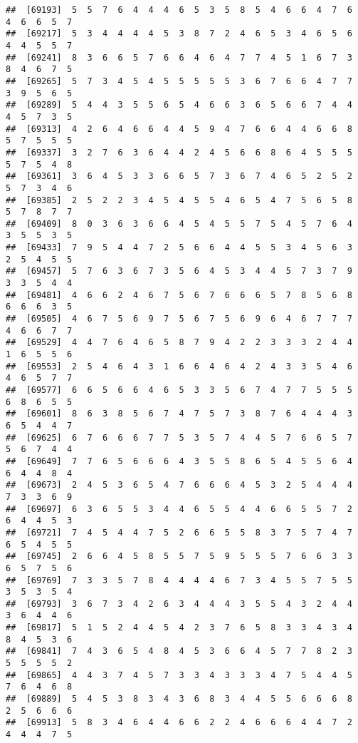 \documentclass[
]{book}
\begin{document}
\begin{verbatim}
##  [69193]  5  5  7  6  4  4  4  6  5  3  5  8  5  4  6  6  4  7  6  4  6  6  5  7
##  [69217]  5  3  4  4  4  4  5  3  8  7  2  4  6  5  3  4  6  5  6  4  4  5  5  7
##  [69241]  8  3  6  6  5  7  6  6  4  6  4  7  7  4  5  1  6  7  3  8  4  6  7  5
##  [69265]  5  7  3  4  5  4  5  5  5  5  5  3  6  7  6  6  4  7  7  3  9  5  6  5
##  [69289]  5  4  4  3  5  5  6  5  4  6  6  3  6  5  6  6  7  4  4  4  5  7  3  5
##  [69313]  4  2  6  4  6  6  4  4  5  9  4  7  6  6  4  4  6  6  8  5  7  5  5  5
##  [69337]  3  2  7  6  3  6  4  4  2  4  5  6  6  8  6  4  5  5  5  5  7  5  4  8
##  [69361]  3  6  4  5  3  3  6  6  5  7  3  6  7  4  6  5  2  5  2  5  7  3  4  6
##  [69385]  2  5  2  2  3  4  5  4  5  5  4  6  5  4  7  5  6  5  8  5  7  8  7  7
##  [69409]  8  0  3  6  3  6  6  4  5  4  5  5  7  5  4  5  7  6  4  3  5  5  3  5
##  [69433]  7  9  5  4  4  7  2  5  6  6  4  4  5  5  3  4  5  6  3  2  5  4  5  5
##  [69457]  5  7  6  3  6  7  3  5  6  4  5  3  4  4  5  7  3  7  9  3  3  5  4  4
##  [69481]  4  6  6  2  4  6  7  5  6  7  6  6  6  5  7  8  5  6  8  6  6  6  3  5
##  [69505]  4  6  7  5  6  9  7  5  6  7  5  6  9  6  4  6  7  7  7  4  6  6  7  7
##  [69529]  4  4  7  6  4  6  5  8  7  9  4  2  2  3  3  3  2  4  4  1  6  5  5  6
##  [69553]  2  5  4  6  4  3  1  6  6  4  6  4  2  4  3  3  5  4  6  4  6  5  7  7
##  [69577]  6  6  5  6  6  4  6  5  3  3  5  6  7  4  7  7  5  5  5  6  8  6  5  5
##  [69601]  8  6  3  8  5  6  7  4  7  5  7  3  8  7  6  4  4  4  3  6  5  4  4  7
##  [69625]  6  7  6  6  6  7  7  5  3  5  7  4  4  5  7  6  6  5  7  5  6  7  4  4
##  [69649]  7  7  6  5  6  6  6  4  3  5  5  8  6  5  4  5  5  6  4  6  4  4  8  4
##  [69673]  2  4  5  3  6  5  4  7  6  6  6  4  5  3  2  5  4  4  4  7  3  3  6  9
##  [69697]  6  3  6  5  5  3  4  4  6  5  5  4  4  6  6  5  5  7  2  6  4  4  5  3
##  [69721]  7  4  5  4  4  7  5  2  6  6  5  5  8  3  7  5  7  4  7  6  5  4  5  5
##  [69745]  2  6  6  4  5  8  5  5  7  5  9  5  5  5  7  6  6  3  3  6  5  7  5  6
##  [69769]  7  3  3  5  7  8  4  4  4  4  6  7  3  4  5  5  7  5  5  3  5  3  5  4
##  [69793]  3  6  7  3  4  2  6  3  4  4  4  3  5  5  4  3  2  4  4  3  6  4  4  6
##  [69817]  5  1  5  2  4  4  5  4  2  3  7  6  5  8  3  3  4  3  4  8  4  5  3  6
##  [69841]  7  4  3  6  5  4  8  4  5  3  6  6  4  5  7  7  8  2  3  5  5  5  5  2
##  [69865]  4  4  3  7  4  5  7  3  3  4  3  3  3  4  7  5  4  4  5  7  6  4  6  8
##  [69889]  5  4  5  3  8  3  4  3  6  8  3  4  4  5  5  6  6  6  8  2  5  6  6  6
##  [69913]  5  8  3  4  6  4  4  6  6  2  2  4  6  6  6  4  4  7  2  4  4  4  7  5

\end{verbatim}
\end{document}
